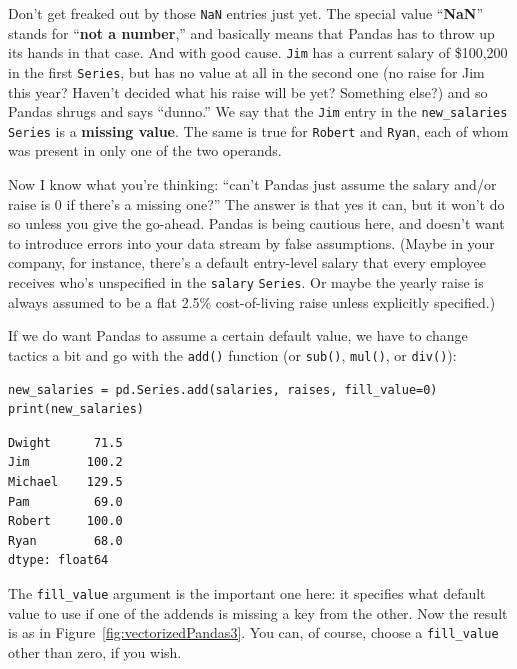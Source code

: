 Don't get freaked out by those \texttt{NaN} entries just yet. The special value
``\textbf{NaN}'' stands for ``\textbf{not a number},'' and basically means that
Pandas has to throw up its hands in that case. And with good cause.
\texttt{Jim} has a current salary of \$100,200 in the first \texttt{Series},
but has no value at all in the second one (no raise for Jim this year? Haven't
decided what his raise will be yet? Something else?) and so Pandas shrugs and
says ``dunno.'' We say that the \texttt{Jim} entry in the
\texttt{new\_salaries} \texttt{Series} is a \textbf{missing value}. The same is
true for \texttt{Robert} and \texttt{Ryan}, each of whom was present in only
one of the two operands.

Now I know what you're thinking: ``can't Pandas just assume the salary and/or
raise is 0 if there's a missing one?'' The answer is that yes it can, but it
won't do so unless you give the go-ahead. Pandas is being cautious here, and
doesn't want to introduce errors into your data stream by false assumptions.
(Maybe in your company, for instance, there's a default entry-level salary that
every employee receives who's unspecified in the \texttt{salary}
\texttt{Series}. Or maybe the yearly raise is always assumed to be a flat 2.5\%
cost-of-living raise unless explicitly specified.)


If we do want Pandas to assume a certain default value, we have to change
tactics a bit and go with the \texttt{add()} function (or \texttt{sub()},
\texttt{mul()}, or \texttt{div()}):

\begin{Verbatim}[fontsize=\small,samepage=true,frame=single]
new_salaries = pd.Series.add(salaries, raises, fill_value=0)
print(new_salaries)
\end{Verbatim}

\begin{Verbatim}[fontsize=\small,samepage=true,frame=leftline,framesep=5mm,framerule=1mm]
Dwight      71.5
Jim        100.2
Michael    129.5
Pam         69.0
Robert     100.0
Ryan        68.0
dtype: float64
\end{Verbatim}

The \texttt{fill\_value} argument is the important one here: it specifies what
default value to use if one of the addends is missing a key from the other. Now
the result is as in Figure~\ref{fig:vectorizedPandas3}. You can, of course,
choose a \texttt{fill\_value} other than zero, if you wish.

